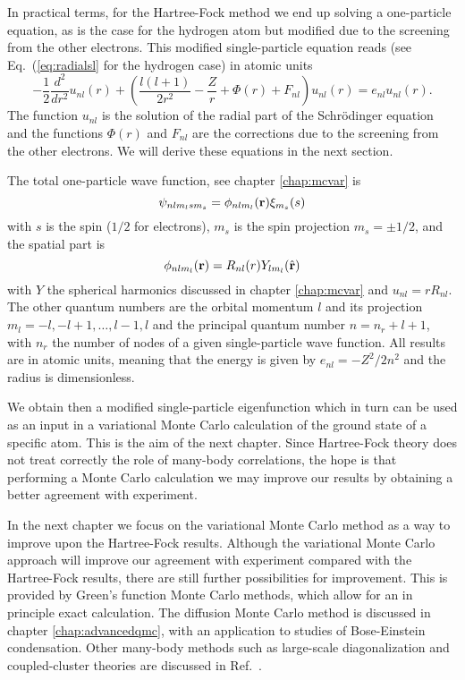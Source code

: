 In practical terms, for the Hartree-Fock method we end up solving a one-particle equation, as is the case for the hydrogen atom but modified due 
to the screening from the other electrons.  This modified single-particle equation reads (see Eq.~(\ref{eq:radialsl} for the hydrogen case)
in atomic units
\[
  -\frac{1}{2} \frac{d^2}{dr^2} u_{nl}(r) 
       + \left (\frac{l (l + 1)}{2r^2}-\frac{Z}{r}+ \Phi(r)+F_{nl}\right ) u_{nl}(r)  = e_{nl} u_{nl}(r) .
\]
The function $u_{nl}$ is the solution of the radial part of the Schr\"odinger equation and the functions $\Phi(r)$ and
$F_{nl}$ are the corrections due to the screening from the other electrons.  We will derive these equations in the next section.

The total one-particle wave function, see chapter \ref{chap:mcvar}  is 
\[
  \psi_{nlm_lsm_s} = \phi_{nlm_l}({\bf r})\xi_{m_s}(s)
\]
with $s$ is the spin ($1/2$ for electrons), $m_s$ is the spin projection $m_s=\pm 1/2$, and the spatial part is
\[
   \phi_{nlm_l}({\bf r}) =  R_{nl}(r)Y_{lm_l}(\hat{{\bf r}})
\]
with $Y$ the spherical harmonics discussed in chapter \ref{chap:mcvar} and $u_{nl} = rR_{nl}$.
The other quantum numbers are the orbital momentum  $l$ and its projection $m_l=-l,-l+1,\dots,l-1,l$ and the principal quantum
number $n=n_r+l+1$, with $n_r$ the number of nodes of a given single-particle wave function. 
All results are in atomic units, meaning that the energy is given by $e_{nl}=-Z^2/2n^2$ and the radius is dimensionless.


We obtain then a modified single-particle eigenfunction which in turn can be used
as an input in a variational Monte Carlo calculation of the ground state of a specific atom. 
This is the aim of the next chapter. Since Hartree-Fock theory does not treat 
correctly the role of many-body correlations, the hope is that
performing a Monte Carlo calculation we may improve our results by obtaining a better agreement with experiment.

In the next chapter we focus 
on the variational Monte Carlo method as a way to improve upon the Hartree-Fock results.  
Although the variational Monte Carlo approach will improve our agreement with experiment compared with the Hartree-Fock results, there are still further possibilities
for improvement. This is provided by Green's function Monte Carlo methods, which allow for an in principle exact calculation.
The diffusion Monte Carlo method is discussed in chapter 
\ref{chap:advancedqmc}, with an application to studies of Bose-Einstein condensation.
Other many-body methods such as large-scale diagonalization and coupled-cluster theories are 
discussed in Ref.~\cite{deanhj2009}.






